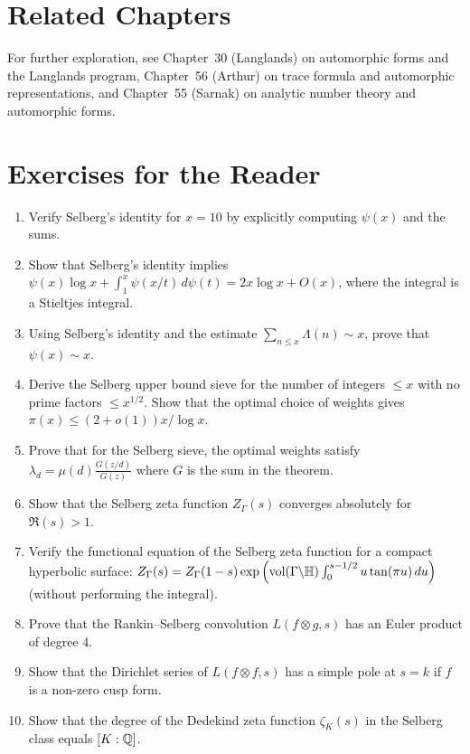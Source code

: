 \section{Related Chapters}
For further exploration, see Chapter~30 (Langlands) on automorphic forms and the Langlands program, Chapter~56 (Arthur) on trace formula and automorphic representations, and Chapter~55 (Sarnak) on analytic number theory and automorphic forms.

\section*{Exercises for the Reader}

\begin{enumerate}
    \item [B] Verify Selberg's identity for \(x = 10\) by explicitly computing \(\psi(x)\) and the sums.
    \item [I] Show that Selberg's identity implies \(\psi(x) \log x + \int_1^x \psi(x/t) \, d\psi(t) = 2x \log x + O(x)\), where the integral is a Stieltjes integral.
    \item [I] Using Selberg's identity and the estimate \(\sum_{n \leq x} \Lambda(n) \sim x\), prove that \(\psi(x) \sim x\).
    \item [I] Derive the Selberg upper bound sieve for the number of integers \(\leq x\) with no prime factors \(\leq x^{1/2}\). Show that the optimal choice of weights gives \(\pi(x) \leq (2 + o(1)) x/\log x\).
    \item [A] Prove that for the Selberg sieve, the optimal weights satisfy \(\lambda_d = \mu(d) \frac{G(z/d)}{G(z)}\) where \(G\) is the sum in the theorem.
    \item [B] Show that the Selberg zeta function \(Z_\Gamma(s)\) converges absolutely for \(\Re(s) > 1\).
    \item [A] Verify the functional equation of the Selberg zeta function for a compact hyperbolic surface: \(Z_\Gamma(s) = Z_\Gamma(1-s) \exp\left( \operatorname{vol}(\Gamma \backslash \mathbb{H}) \int_0^{s-1/2} u \tan(\pi u) \, du \right)\) (without performing the integral).
    \item [I] Prove that the Rankin--Selberg convolution \(L(f \otimes g, s)\) has an Euler product of degree 4.
    \item [I] Show that the Dirichlet series of \(L(f \otimes f, s)\) has a simple pole at \(s = k\) if \(f\) is a non-zero cusp form.
    \item [B] Show that the degree of the Dedekind zeta function \(\zeta_K(s)\) in the Selberg class equals \([K:\mathbb{Q}]\).

\end{enumerate}
